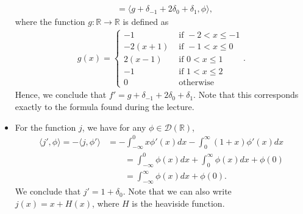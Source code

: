 \documentclass[11pt]{article}
\begin{document}
\begin{solution}
\begin{itemize}
\begin{align*}
			\\
            &
			= \langle g + \delta_{-1} + 2\delta_{0} + \delta_{1} , \phi \rangle
			,
        \end{align*}
        where the function $g: \mathbb{R} \to \mathbb{R}$ is defined as
        \begin{align*}
            g(x) = \begin{cases} 
					-1 & \text{ if } -2 < x \leq -1 
					\\ 
					-2(x + 1) & \text{ if } -1 < x \leq 0 
					\\ 
					2(x - 1) & \text{ if } 0 < x \leq 1 
					\\ 
					-1 & \text{ if } 1 < x \leq 2 
					\\ 
					0 & \text{ otherwise } 
					\end{cases}.
        \end{align*}
        Hence, we conclude that $f' = g + \delta_{-1} + 2\delta_{0} + \delta_{1}$. Note that this corresponds exactly to the formula found during the lecture.
		\item For the function $j$, we have for any $\phi \in \mathcal D(\mathbb{R})$,
        \begin{align*}
            \langle j', \phi \rangle 
			= 
			- \langle j, \phi'\rangle 
			&
			= 
			- 
			\int_{-\infty}^{0} x \phi'(x) dx 
			- 
			\int_{0}^{\infty} ( 1 + x ) \phi'(x) dx 
			\\&\qquad 
			= 
			\int_{-\infty}^{0} \phi(x) dx 
			+
			\int_{0}^{\infty}  \phi(x) dx + \phi(0) 
			\\&\qquad 
			= 
			\int_{-\infty}^{\infty} \phi(x) dx + \phi(0) 
			.
		\end{align*}
		We conclude that $j' = 1 + \delta_0$.
		Note that we can also write $j(x) = x + H(x)$, where $H$ is the heaviside function.
    \end{itemize}
\end{solution}
\end{document}
